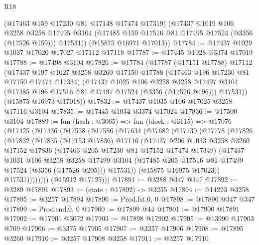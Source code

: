 \begin{lexlean}{R18}
\begin{coremodule}
        (@17463 @159 @17230 @81 @17148 @17474 @17319)
        (@17437
          @1019
          @106
          @3258
          @3258
          @17495
          @3104
          (@17485 @159 @17516 @81 @17495 @17524 (@3356 (@17526 @159)))
          @17531))
      (@15875 @16971 @17013))
@17784 := @17437 @1029 @1037 @17020 @17027 @17112 @17118
@17787 := @17445 @1028 @3374 @17019
@17788 := @17498 @3104
@17826 := @17784
    (@17787
      (@17151 @17788)
      @17112
      (@17437
        @197
        @1027
        @3258
        @3260
        @17150
        @17788
        (@17463 @196 @17230 @81 @17150 @17474 @17334)
        (@17437
          @1025
          @106
          @3258
          @3258
          @17497
          @3104
          (@17485 @196 @17516 @81 @17497 @17524 (@3356 (@17526 @196)))
          @17531))
      (@15875 @16973 @17018))
@17832 := @17437 @1035 @106 @17025 @3258 @17116 @3104
@17835 := @17445 @1034 @3374 @17024
@17836 := @17500 @3104
@17889 := fun (hash : @3065) =>
  fun (block : @3115) =>
  @17076
    (@17425
      (@17436
        (@17538
          (@17586
            (@17634
              (@17682
                (@17730
                  (@17778
                    (@17826
                      (@17832
                        (@17835
                          (@17153 @17836)
                          @17116
                          (@17437
                            @206
                            @1033
                            @3258
                            @3260
                            @17152
                            @17836
                            (@17463 @205 @17230 @81 @17152 @17474 @17349)
                            (@17437
                              @1031
                              @106
                              @3258
                              @3258
                              @17499
                              @3104
                              (@17485 @205 @17516 @81 @17499 @17524 (@3356 (@17526 @205)))
                              @17531))
                          (@15875 @16975 @17023))
                        @17531))))))))
        (@15912 @17125)))
@17891 := @3288 @347 @347
@17892 := @3289 @17891
@17893 := (state : @17892) -> @3255
@17894 := @14223 @3258
@17895 := @3257 @17894
@17896 := Prod.fst.{0, 0}
@17898 := @17896 @347 @347
@17899 := Prod.snd.{0, 0}
@17900 := @17899 @44
@17901 := @17900 @17891
@17902 := @17901 @3072
@17903 := @17898 @17902
@17905 := @13990 @17903 @709
@17906 := @3375 @17905
@17907 := @3257 @17906
@17908 := @17895 @3260
@17910 := @3257 @17908 @3258
@17911 := @3257 @17910

\end{coremodule}
\end{lexlean}
